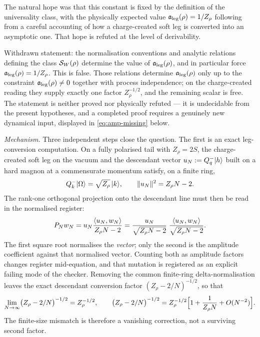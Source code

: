 The natural hope was that this constant is fixed by the definition of the
universality class, with the physically expected value $\mathfrak{a}_{\mathrm{leg}}(\rho) = 1/Z_\rho$
following from a careful accounting of how a charge-created soft leg is
converted into an asymptotic one. That hope is refuted at the level of
derivability.

\begin{refutedclaim}
\label{ref:amputation}
Withdrawn statement: the normalisation conventions and analytic relations
defining the class $\mathcal{S}_W(\rho)$ determine the value of $\mathfrak{a}_{\mathrm{leg}}(\rho)$, and
in particular force $\mathfrak{a}_{\mathrm{leg}}(\rho) = 1/Z_\rho$. This is false. Those relations
determine $\mathfrak{a}_{\mathrm{leg}}(\rho)$ only up to the constraint $\mathfrak{a}_{\mathrm{leg}}(\rho) \neq 0$
together with process independence; on the charge-created reading they supply
exactly one factor $Z_\rho^{-1/2}$, and the remaining scalar is free. The
statement is neither proved nor physically refuted — it is undecidable from
the present hypotheses, and a completed proof requires a genuinely new
dynamical input, displayed in \eqref{eq:amp-missing} below.
\end{refutedclaim}

\emph{Mechanism.} Three independent steps close the question. The first is an
exact leg-conversion computation. On a fully polarised tail with $Z_\rho = 2S$,
the charge-created soft leg on the vacuum and the descendant vector
$u_N := Q^-_q|h\rangle$ built on a hard magnon at a commensurate momentum satisfy,
on a finite ring,
\begin{equation}
  Q^-_k|\Omega\rangle = \sqrt{Z_\rho}\,|k\rangle,
  \qquad
  \lVert u_N\rVert^2 = Z_\rho N - 2 .
  \label{eq:leg-conversion}
\end{equation}
The rank-one orthogonal projection onto the descendant line must then be read
in the normalised register:
\begin{equation}
  P_N w_N
  = u_N \frac{\langle u_N,w_N\rangle}{Z_\rho N - 2}
  = \frac{u_N}{\sqrt{Z_\rho N - 2}}\;
    \frac{\langle u_N,w_N\rangle}{\sqrt{Z_\rho N - 2}} .
  \label{eq:amp-projection}
\end{equation}
The first square root normalises the \emph{vector}; only the second is the
amplitude coefficient against that normalised vector. Counting both as
amplitude factors changes register mid-equation, and that mutation is
registered as an explicit failing mode of the checker. Removing the common
finite-ring delta-normalisation leaves the exact descendant conversion factor
$(Z_\rho - 2/N)^{-1/2}$, so that
\begin{equation}
  \lim_{N\to\infty}\bigl(Z_\rho - 2/N\bigr)^{-1/2} = Z_\rho^{-1/2},
  \qquad
  \bigl(Z_\rho - 2/N\bigr)^{-1/2}
  = Z_\rho^{-1/2}\Bigl[1 + \frac{1}{Z_\rho N} + O(N^{-2})\Bigr].
\end{equation}
The finite-size mismatch is therefore a vanishing correction, not a surviving
second factor.

